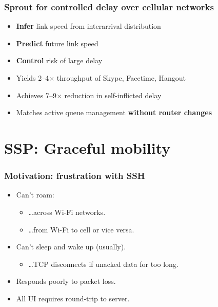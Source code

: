 \documentclass[svgnames]{beamer}
\begin{document}
\begin{frame}
\frametitle{Sprout for controlled delay over cellular networks}

\begin{itemize}
\item \textbf{Infer} link speed from interarrival distribution

\item \textbf{Predict} future link speed

\item \textbf{Control} risk of large delay

\item Yields 2--4$\times$ throughput of Skype, Facetime, Hangout

\item Achieves 7--9$\times$ reduction in self-inflicted delay

\item Matches active queue management \textbf{without router changes}

\end{itemize}

\end{frame}

\section{SSP: Graceful mobility}

\begin{frame}
\tableofcontents[currentsection]
\end{frame}

\begin{frame}
\frametitle{Motivation: frustration with SSH}

\begin{itemize}

\item Can't roam:

\begin{itemize}
\item \ldots across Wi-Fi networks.
\item \ldots from Wi-Fi to cell or vice versa.
\end{itemize}

\item Can't sleep and wake up (usually).

\begin{itemize}
\item \ldots TCP disconnects if unacked data for too long.
\end{itemize}

\item Responds poorly to packet loss.

\item All UI requires round-trip to server.

\end{itemize}

\end{frame}
\end{document}
